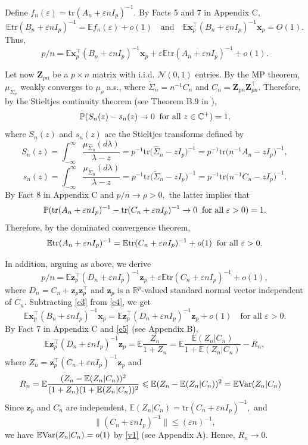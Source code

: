 \documentclass[12pt, a4paper]{article}
\newcommand\x{\mathbf x}
\newcommand\bR{{\mathbb R}}
\newcommand\Z{{\mathbf Z}}
\newcommand\z{{\mathbf z}}
\newcommand\wh{\widehat }
\newcommand\wt{\widetilde }
\newcommand\e{{\mathbb E}}
\newcommand\p{{\mathbb P}}
\newcommand\var{{\rm Var}}
\newcommand\tr{{\mathrm{tr}}}
\begin{document}
Define $f_n(\varepsilon)=\tr(A_n+\varepsilon nI_p)^{-1}$. By Facts 5 and 7 in Appendix C,
\[\e\tr(B_n+\varepsilon nI_p)^{-1}=\e f_n(\varepsilon)+o(1)\quad\text{and}\quad \e \x_p^\top(B_n +\varepsilon nI_p)^{-1}\x_p=O(1).\]
Thus,
\begin{equation}
\label{e3}
p/n=\e \x_p^\top(B_n +\varepsilon nI_p)^{-1}\x_p+\varepsilon \e \tr(A_n +\varepsilon nI_p)^{-1}+o(1).
\end{equation}

Let now  $\Z_{pn}$ be a $p\times n$ matrix with i.i.d. $\mathcal N(0,1)$ entries. By the MP theorem,  $\mu_{\widetilde\Sigma_n}$ weakly converges to $\mu_\rho$ a.s., where  $\widetilde\Sigma_n=n^{-1}C_n$ and $C_n=\Z_{pn}\Z_{pn}^\top$. Therefore, by the Stieltjes continuity theorem (see Theorem B.9 in \cite{BS}),
\[\p(S_n(z)-s_n(z)\to 0 \text{\;\;for all }z\in\mathbb C^+)=1,\]
where $S_n(z)$ and $s_n(z)$ are  the Stieltjes transforms defined by
\[S_n(z)=\int_{-\infty}^\infty\frac{ \mu_{\wh\Sigma_n}(d\lambda)}{\lambda -z}=p^{-1}\tr\big(\wh\Sigma_n-zI_p\big)^{-1}=p^{-1}\tr\big(n^{-1}A_n-zI_p\big)^{-1},\]
\[s_n(z)=\int_{-\infty}^\infty\frac{ \mu_{\wt\Sigma_n}(d\lambda)}{\lambda -z}=p^{-1}\tr\big(\wt \Sigma_n-zI_p\big)^{-1}=p^{-1}\tr\big(n^{-1}C_n-zI_p\big)^{-1}.\] 
By Fact 8 in Appendix C and $p/n\to \rho >0,$ the latter implies that 
\begin{equation}
\label{e101}
\p(\tr(A_n +\varepsilon nI_p)^{-1}-\tr(C_n +\varepsilon nI_p)^{-1}\to 0\text{\;\;for all }\varepsilon>0)=1.\end{equation}
Therefore, by the dominated convergence theorem, 
\[
\e \tr(A_n +\varepsilon nI_p)^{-1}=\e \tr(C_n +\varepsilon nI_p)^{-1}+o(1)\text{\;\;for all }\varepsilon>0.
\]


In addition, arguing as above, we derive
\begin{equation}
\label{e4}
p/n=\e \z_p^\top(D_n +\varepsilon nI_p)^{-1}\z_p+\varepsilon \e \tr(C_n +\varepsilon nI_p)^{-1}+o(1),
\end{equation}
where $D_n=C_n+\z_p\z_p^\top$ and $\z_p$ is a $\bR^p$-valued  standard normal vector independent of $C_n$. Subtracting \eqref{e3} from \eqref{e4}, we get
\[\e \x_p^\top(B_n +\varepsilon nI_p)^{-1}\x_p=\e \z_p^\top(D_n +\varepsilon nI_p)^{-1}\z_p+o(1)\quad\text{for all }\varepsilon>0.\]
By Fact 7 in Appendix C and \eqref{e5} (see Appendix B), 
\[\e \z_p^\top(D_n +\varepsilon nI_p)^{-1}\z_p=\e \frac{Z_n}{1+Z_n}=\e  \frac{\e (Z_n|C_n)}{1+\e (Z_n|C_n) }-R_n,\]
where $Z_n=\z_p^\top(C_n +\varepsilon nI_p)^{-1}\z_p$ and 
\begin{align*}
 R_n=\e\frac{(Z_n-\e (Z_n|C_n))^2}{(1+Z_n)(1+\e (Z_n|C_n))^2}&\leqslant \e (Z_n-\e( Z_n|C_n))^2=\e \var(Z_n|C_n)
 \end{align*}
Since $\z_p$ and $C_n$ are independent, $\e (Z_n|C_n)=\tr(C_n +\varepsilon nI_p)^{-1},$ and \[\|(C_n +\varepsilon nI_p)^{-1}\|\leqslant (\varepsilon n)^{-1},\]
we have $\e \var(Z_n|C_n)=o(1)$ by \eqref{v1} (see Appendix A). Hence, $R_n\to 0.$
\end{document}
